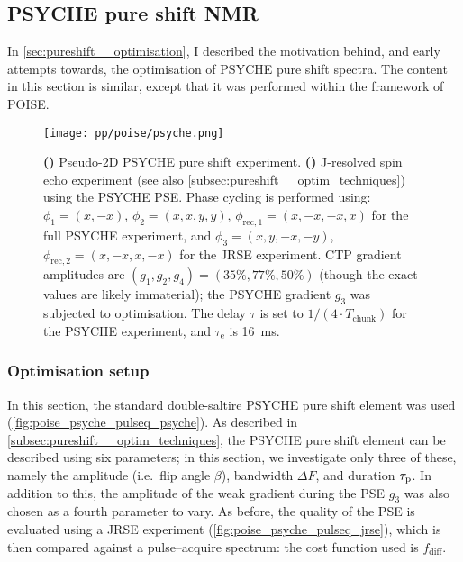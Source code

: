 \subsection{PSYCHE pure shift NMR}
\label{subsec:poise__psyche}

In \cref{sec:pureshift__optimisation}, I described the motivation behind, and early attempts towards, the optimisation of PSYCHE pure shift spectra.
The content in this section is similar, except that it was performed within the framework of POISE.

\begin{figure}[htb]
    \centering
    \texttt{[image: pp/poise/psyche.png]}%
    {\label{fig:poise_psyche_pulseq_psyche}}%
    {\label{fig:poise_psyche_pulseq_jrse}}%
    \caption[Pulse sequences used for PSYCHE optimisations]{
        \textbf{()} Pseudo-2D PSYCHE pure shift experiment.
        \textbf{()} J-resolved spin echo experiment (see also \cref{subsec:pureshift__optim_techniques}) using the PSYCHE PSE.
        Phase cycling is performed using: $\phi_1 = (x, -x)$, $\phi_2 = (x, x, y, y)$, $\phi_{\text{rec},1} = (x, -x, -x, x)$ for the full PSYCHE experiment, and $\phi_3 = (x, y, -x, -y)$, $\phi_{\text{rec},2} = (x, -x, x, -x)$ for the JRSE experiment.
        CTP gradient amplitudes are $(g_1, g_2, g_4) = (35\%, 77\%, 50\%)$ (though the exact values are likely immaterial); the PSYCHE gradient $g_3$ was subjected to optimisation.
        The delay $\tau$ is set to $1/(4 \cdot T_\text{chunk})$ for the PSYCHE experiment, and $\tau_\text{e}$ is \qty{16}{\ms}.
    }
    \label{fig:poise_psyche_pulseq}
\end{figure}



\subsubsection{Optimisation setup}

In this section, the standard double-saltire PSYCHE pure shift element was used (\cref{fig:poise_psyche_pulseq_psyche}).\autocite{Foroozandeh2014ACIE,Foroozandeh2018CEJ}
As described in \cref{subsec:pureshift__optim_techniques}, the PSYCHE pure shift element can be described using six parameters; in this section, we investigate only three of these, namely the amplitude (i.e.\ flip angle $\beta$), bandwidth $\Delta F$, and duration $\tau_\mathrm{p}$.
In addition to this, the amplitude of the weak gradient during the PSE $g_3$ was also chosen as a fourth parameter to vary.
As before, the quality of the PSE is evaluated using a JRSE experiment (\cref{fig:poise_psyche_pulseq_jrse}), which is then compared against a pulse--acquire spectrum: the cost function used is $f_\text{diff}$.

